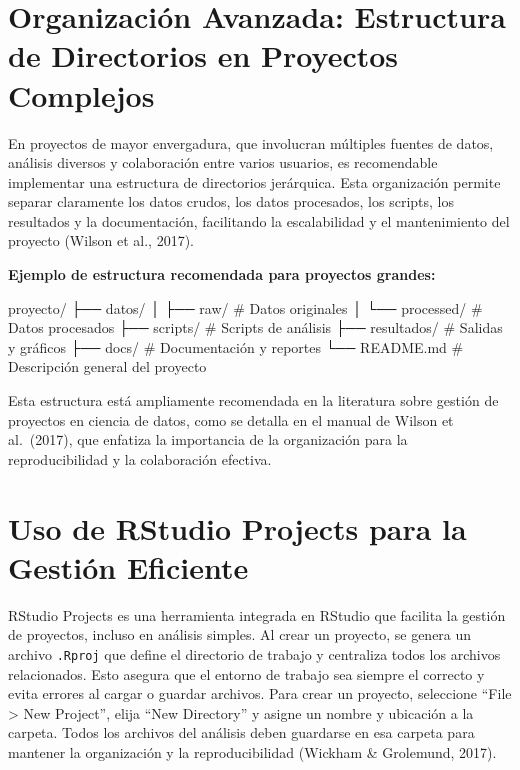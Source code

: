 \documentclass[
  spanish,
  a4paper,
  DIV=11,
  numbers=noendperiod,
  onepage,
  openany]{scrreprt}
\newenvironment{Shaded}{\begin{snugshade}}{\end{snugshade}}
\newcommand{\CommentTok}[1]{\textcolor[rgb]{0.37,0.37,0.37}{#1}}
\newcommand{\NormalTok}[1]{\textcolor[rgb]{0.00,0.23,0.31}{#1}}
\newcommand{\SpecialCharTok}[1]{\textcolor[rgb]{0.37,0.37,0.37}{#1}}
\begin{document}
\section{Organización Avanzada: Estructura de Directorios en Proyectos
Complejos}\label{organizaciuxf3n-avanzada-estructura-de-directorios-en-proyectos-complejos}

En proyectos de mayor envergadura, que involucran múltiples fuentes de
datos, análisis diversos y colaboración entre varios usuarios, es
recomendable implementar una estructura de directorios jerárquica. Esta
organización permite separar claramente los datos crudos, los datos
procesados, los scripts, los resultados y la documentación, facilitando
la escalabilidad y el mantenimiento del proyecto (Wilson et al., 2017).

\textbf{Ejemplo de estructura recomendada para proyectos grandes:}

\begin{Shaded}
\begin{Highlighting}[]
\NormalTok{proyecto}\SpecialCharTok{/}
\NormalTok{├── datos}\SpecialCharTok{/}
\NormalTok{│   ├── raw}\SpecialCharTok{/}         \CommentTok{\# Datos originales}
\NormalTok{│   └── processed}\SpecialCharTok{/}   \CommentTok{\# Datos procesados}
\NormalTok{├── scripts}\SpecialCharTok{/}         \CommentTok{\# Scripts de análisis}
\NormalTok{├── resultados}\SpecialCharTok{/}      \CommentTok{\# Salidas y gráficos}
\NormalTok{├── docs}\SpecialCharTok{/}            \CommentTok{\# Documentación y reportes}
\NormalTok{└── README.md        }\CommentTok{\# Descripción general del proyecto}
\end{Highlighting}
\end{Shaded}

Esta estructura está ampliamente recomendada en la literatura sobre
gestión de proyectos en ciencia de datos, como se detalla en el manual
de Wilson et al.~(2017), que enfatiza la importancia de la organización
para la reproducibilidad y la colaboración efectiva.

\section{Uso de RStudio Projects para la Gestión
Eficiente}\label{uso-de-rstudio-projects-para-la-gestiuxf3n-eficiente}

RStudio Projects es una herramienta integrada en RStudio que facilita la
gestión de proyectos, incluso en análisis simples. Al crear un proyecto,
se genera un archivo \texttt{.Rproj} que define el directorio de trabajo
y centraliza todos los archivos relacionados. Esto asegura que el
entorno de trabajo sea siempre el correcto y evita errores al cargar o
guardar archivos. Para crear un proyecto, seleccione ``File
\textgreater{} New Project'', elija ``New Directory'' y asigne un nombre
y ubicación a la carpeta. Todos los archivos del análisis deben
guardarse en esa carpeta para mantener la organización y la
reproducibilidad (Wickham \& Grolemund, 2017).
\end{document}
